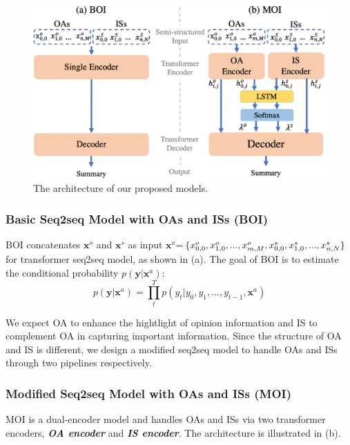 \begin{figure}[th]
	\centering
	\includegraphics[width=1\linewidth]{./model.pdf}
	\caption{The architecture of our proposed models.}
	\label{fig:model}
\end{figure}       


\subsubsection{Basic Seq2seq Model with OAs and ISs (BOI)} 
BOI concatenates $\textbf{x}^o$ and $\textbf{x}^s$
as input $\textbf{x}^a$=$\{x^o_{0,0},x^o_{1,0},...,x^o_{m,M},x^s_{0,0}, x^s_{1,0},...,\\x^s_{n,N}\}$
for transformer seq2seq model, as shown in (a). 
The goal of BOI is to estimate the conditional probability
$p(\textbf{y}|\textbf{x}^a)$:
\begin{equation}
	p(\textbf{y}|\textbf{x}^a) \!=\! 
	{\prod^T_{t} {p(y_{t} | y_{0}, y_{1},..., y_{t-1}, \textbf{x}^a)}}        
\end{equation}
 
We expect OA to enhance
the hightlight of opinion information and IS to complement OA in capturing important information.
Since the structure of OA and IS is different,
we design a modified seq2seq model to handle OAs and ISs through two pipelines respectively.



\subsubsection{Modified Seq2seq Model with OAs and ISs (MOI)}
MOI is a dual-encoder model and handles OAs and ISs
via two transformer encoders, \textbf{\em OA encoder} and \textbf{\em IS encoder}. 
The architecture is illustrated in (b).

